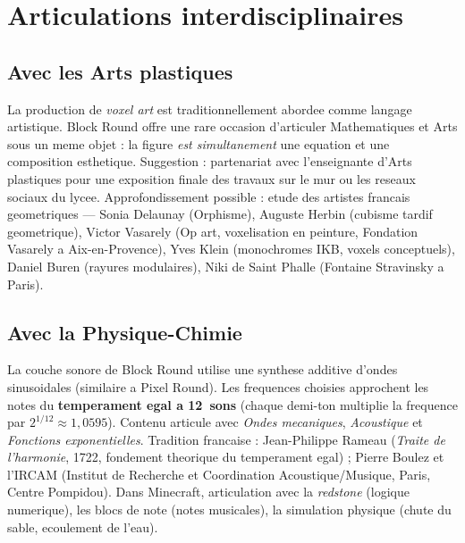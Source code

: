 \documentclass[12pt,a4paper]{scrartcl}
\newcommand{\acc}[1]{\textcolor{accent}{\textbf{#1}}}
\begin{document}
\section{Articulations interdisciplinaires}\label{sec:interdisc}

\subsection{Avec les Arts plastiques}
La production de \emph{voxel art} est traditionnellement abordee comme langage artistique. Block Round offre une rare occasion d'articuler Mathematiques et Arts sous un meme objet : la figure \emph{est simultanement} une equation et une composition esthetique. Suggestion : partenariat avec l'enseignant\textperiodcentered e d'Arts plastiques pour une exposition finale des travaux sur le mur ou les reseaux sociaux du lycee. Approfondissement possible : etude des artistes francais geometriques --- Sonia Delaunay (Orphisme), Auguste Herbin (cubisme tardif geometrique), Victor Vasarely (Op art, voxelisation en peinture, Fondation Vasarely a Aix-en-Provence), Yves Klein (monochromes IKB, voxels conceptuels), Daniel Buren (rayures modulaires), Niki de Saint Phalle (Fontaine Stravinsky a Paris).

\subsection{Avec la Physique-Chimie}
La couche sonore de Block Round utilise une synthese additive d'ondes sinusoidales (similaire a Pixel Round). Les frequences choisies approchent les notes du \acc{temperament egal a 12~sons} (chaque demi-ton multiplie la frequence par $2^{1/12} \approx 1{,}0595$). Contenu articule avec \emph{Ondes mecaniques}, \emph{Acoustique} et \emph{Fonctions exponentielles}. Tradition francaise : Jean-Philippe Rameau (\emph{Traite de l'harmonie}, 1722, fondement theorique du temperament egal) ; Pierre Boulez et l'IRCAM (Institut de Recherche et Coordination Acoustique/Musique, Paris, Centre Pompidou). Dans Minecraft, articulation avec la \emph{redstone} (logique numerique), les blocs de note (notes musicales), la simulation physique (chute du sable, ecoulement de l'eau).
\end{document}
